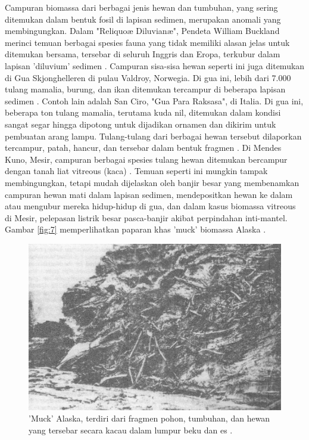 \documentclass[10pt,twocolumn,letterpaper]{article}
\begin{document}
Campuran biomassa dari berbagai jenis hewan dan tumbuhan, yang sering ditemukan dalam bentuk fosil di lapisan sedimen, merupakan anomali yang membingungkan. Dalam "Reliquoæ Diluvianæ", Pendeta William Buckland merinci temuan berbagai spesies fauna yang tidak memiliki alasan jelas untuk ditemukan bersama, tersebar di seluruh Inggris dan Eropa, terkubur dalam lapisan 'diluvium' sedimen \cite{58}. Campuran sisa-sisa hewan seperti ini juga ditemukan di Gua Skjonghelleren di pulau Valdroy, Norwegia. Di gua ini, lebih dari 7.000 tulang mamalia, burung, dan ikan ditemukan tercampur di beberapa lapisan sedimen \cite{59}. Contoh lain adalah San Ciro, "Gua Para Raksasa", di Italia. Di gua ini, beberapa ton tulang mamalia, terutama kuda nil, ditemukan dalam kondisi sangat segar hingga dipotong untuk dijadikan ornamen dan dikirim untuk pembuatan arang lampu. Tulang-tulang dari berbagai hewan tersebut dilaporkan tercampur, patah, hancur, dan tersebar dalam bentuk fragmen \cite{60,61}. Di Mendes Kuno, Mesir, campuran berbagai spesies tulang hewan ditemukan bercampur dengan tanah liat vitreous (kaca) \cite{57}. Temuan seperti ini mungkin tampak membingungkan, tetapi mudah dijelaskan oleh banjir besar yang membenamkan campuran hewan mati dalam lapisan sedimen, mendepositkan hewan ke dalam atau mengubur mereka hidup-hidup di gua, dan dalam kasus biomassa vitreous di Mesir, pelepasan listrik besar pasca-banjir akibat perpindahan inti-mantel. Gambar \ref{fig:7} memperlihatkan paparan khas 'muck' biomassa Alaska \cite{56}.

\begin{figure}[t]
\begin{center}
   \includegraphics[width=1\linewidth]{muck-crop.jpeg}
\end{center}
   \caption{'Muck' Alaska, terdiri dari fragmen pohon, tumbuhan, dan hewan yang tersebar secara kacau dalam lumpur beku dan es \cite{146}.}
\label{fig:7}
\label{fig:onecol}
\end{figure}
\end{document}
